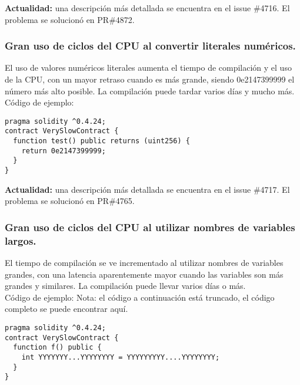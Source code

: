 \textbf{Actualidad:} una descripción más detallada se encuentra en el issue \#4716. El problema se solucionó en PR\#4872.

\subsubsection{Gran uso de ciclos del CPU al convertir literales numéricos.}

El uso de valores numéricos literales aumenta el tiempo de compilación y el uso de la CPU, con un mayor retraso cuando es más grande, siendo 0e2147399999 el número más alto posible. La compilación puede tardar varios días y mucho más.\\

Código de ejemplo:
\begin{lstlisting}[language=Solidity]
pragma solidity ^0.4.24;                                                  
contract VerySlowContract {                                                                                                                                
  function test() public returns (uint256) {                                                                                                   
    return 0e2147399999;                                                                                                                       
  }                                                                                                                                            
}
\end{lstlisting}

\textbf{Actualidad:} una descripción más detallada se encuentra en el issue \#4717. El problema se solucionó en PR\#4765.

\subsubsection{Gran uso de ciclos del CPU al utilizar nombres de variables largos.}

El tiempo de compilación se ve incrementado al utilizar nombres de variables grandes, con una latencia aparentemente mayor cuando las variables son más grandes y similares. La compilación puede llevar varios días o más.\\

Código de ejemplo:
Nota: el código a continuación está truncado, el código completo se puede encontrar aquí.
\begin{lstlisting}[language=Solidity]
pragma solidity ^0.4.24;
contract VerySlowContract {
  function f() public {
    int YYYYYYY...YYYYYYYY = YYYYYYYYY....YYYYYYYY;      
  }
}
\end{lstlisting}

